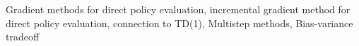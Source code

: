 Gradient methods for direct policy evaluation, incremental gradient method for direct policy evaluation, connection to TD(1), Multistep methods, Bias-variance tradeoff